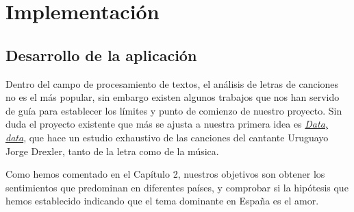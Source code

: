 \chapter{Implementaci\'on}
\label{cap:implementacion}

\section{Desarrollo de la aplicación}
Dentro del campo de procesamiento de textos, el análisis de letras de canciones no es el más popular, sin embargo existen algunos trabajos que nos han servido de guía para establecer los límites y punto de comienzo de nuestro proyecto. Sin duda el proyecto existente que más se ajusta a nuestra primera idea es \href{https://medium.com/@alexing/data-data-b82201ec1cf4}{\textit{Data, data}}, que hace un estudio exhaustivo de las canciones del cantante Uruguayo Jorge Drexler, tanto de la letra como de la música.

Como hemos comentado en el Capítulo 2, nuestros objetivos son obtener los sentimientos que predominan en diferentes países, y comprobar si la hipótesis que hemos establecido indicando que el tema dominante en España es el amor.

